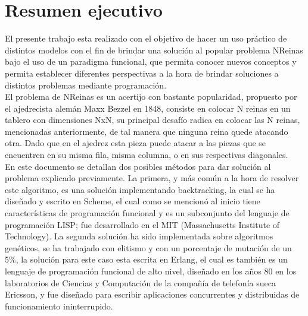 \documentclass[12pt,a4paper]{article}
\begin{document}
\section{Resumen ejecutivo}
\bigskip
 	El presente trabajo esta realizado con el objetivo de hacer un uso práctico de distintos modelos con el fin de brindar una solución al popular problema NReinas bajo el uso de un paradigma funcional, que permita conocer nuevos conceptos y permita establecer diferentes perspectivas a la hora de brindar soluciones a distintos problemas mediante programación. \\
 	
 	El problema de NReinas es un acertijo con bastante popularidad, propuesto por el ajedrecista alemán Maxx Bezzel en 1848, consiste en colocar N reinas en un tablero con dimensiones NxN, su principal desafío radica en colocar las N reinas, mencionadas anteriormente, de tal manera que ninguna reina quede atacando otra. Dado que en el ajedrez esta pieza puede atacar a las piezas que se encuentren en su misma fila, misma columna, o en sus respectivas diagonales. \\
 	
 	En este documento se detallan dos posibles métodos para dar solución al problema explicado previamente. La primera, y más común a la hora de resolver este algoritmo, es una solución implementando backtracking, la cual se ha diseñado y escrito en Scheme, el cual como se mencionó al inicio tiene características de programación funcional y es un subconjunto del lenguaje de programación LISP; fue desarrollado en el MIT (Massachusetts Institute of Technology). La segunda solución ha sido implementada sobre algoritmos genéticos, se ha trabajado con elitismo y con un porcentaje de mutación de un 5\%, la solución para este caso esta escrita en Erlang, el cual es también es un lenguaje de programación funcional de alto nivel, diseñado en los años 80 en los laboratorios de Ciencias y Computación de la compañía de telefonía sueca Ericsson, y fue diseñado para escribir aplicaciones concurrentes y distribuidas de funcionamiento ininterrupido. \\
 	
\end{document}
